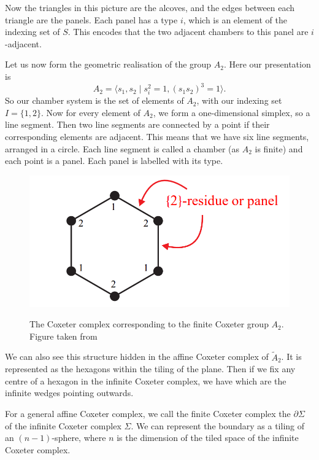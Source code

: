 \documentclass[11pt]{article}
\begin{document}
Now the triangles in this picture are the alcoves, and the edges between each triangle are the panels. Each panel has a type $i$, which is an element of the indexing set of $S$. This encodes that the two adjacent chambers to this panel are $i$-adjacent. 


Let us now form the geometric realisation of the group $A_2$. Here our presentation is 
\[A_2=\langle s_1,s_2\mid s_i^2=1, (s_1s_2)^3=1\rangle.\]
So our chamber system is the set of elements of $A_2$, with our indexing set $I=\{1,2\}$. Now for every element of $A_2$, we form a one-dimensional simplex, so a line segment. Then two line segments are connected by a point if their corresponding elements are adjacent. This means that we have six line segments, arranged in a circle. Each line segment is called a chamber (as $A_2$ is finite) and each point is a panel. Each panel is labelled with its type.

\begin{figure}[!htbp]
    \begin{center}
        \includegraphics[scale=0.5]{Screenshot 2023-03-21 135437.png}\\
    \end{center}
    \caption{The Coxeter complex corresponding to the finite Coxeter group $A_2$. Figure taken from \cite[p.10]{EVERITT}}
\end{figure}

We can also see this structure hidden in the affine Coxeter complex of $\tilde{A}_2$. It is represented as the hexagons within the tiling of the plane. Then if we fix any centre of a hexagon in the infinite Coxeter complex, we have  which are the infinite wedges pointing outwards. 

For a general affine Coxeter complex, we call the finite Coxeter complex the  $\partial\Sigma$ of the infinite Coxeter complex $\Sigma$. We can represent the boundary as a tiling of an $(n-1)$-sphere, where $n$ is the dimension of the tiled space of the infinite Coxeter complex. 
\end{document}

